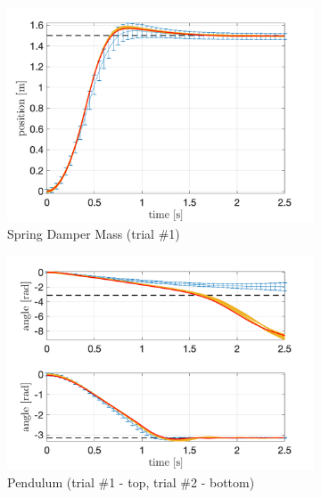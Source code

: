 \documentclass[letterpaper, 10 pt, conference]{ieeeconf}  %
\begin{document}
\begin{figure}[!thp] 
	\centering
	\begin{subfigure}{0.325\textwidth}
	\includegraphics[width=\textwidth]{sdm_quad.png}
	\caption{Spring Damper Mass (trial \#1)\newline}\label{fig:PILCO_sdm}
	\end{subfigure}
	\begin{subfigure}{0.325\textwidth}
	\includegraphics[width=\textwidth]{pend_quad.png}
	\caption{Pendulum (trial \#1 - top, trial \#2 - bottom)\newline}\label{fig:PILCO_pendulum}
	\end{subfigure}
	\begin{subfigure}{0.325\textwidth}

\end{subfigure}
\end{figure}
\end{document}
